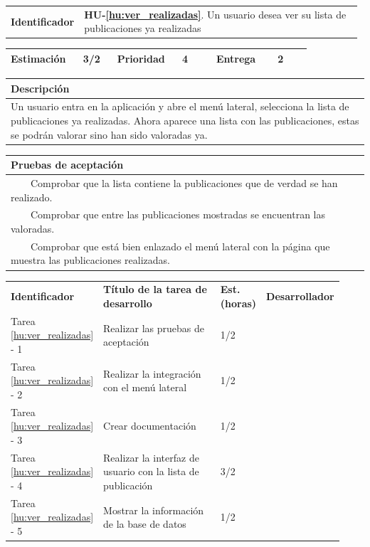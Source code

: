 \documentclass[11pt]{article}
\newcommand{\tabitem}{~~\llap{\textbullet}~~}
\begin{document}
\begin{longtable}{p{0.18\linewidth}|p{0.8\linewidth}}
	\rowcolor{LightCyan}
	\textbf{Identificador} & \textbf{HU-\ref{hu:ver_realizadas}}. Un usuario desea ver su lista de publicaciones ya realizadas \\  
\end{longtable}
\vspace{-0.8cm}
\begin{longtable}{p{0.18\linewidth}|p{0.1\linewidth}|p{0.18\linewidth}|p{0.1\linewidth}|p{0.18\linewidth}|p{0.1\linewidth}}
	\toprule
	\textbf{Estimación} & 3/2 & \textbf{Prioridad} & 4 & \textbf{Entrega} & 2 \\
	\bottomrule
\end{longtable}
\vspace{-0.8cm}
\begin{longtable}{p{1.028\linewidth}}
	\textbf{Descripción}\\
	\midrule
	Un usuario entra en la aplicación y abre el menú lateral, selecciona la lista de publicaciones ya realizadas. Ahora aparece una lista con las publicaciones, estas se podrán valorar sino han sido valoradas ya. \\
	\bottomrule
\end{longtable}
\vspace{-0.8cm}
\begin{longtable}{p{1.028\linewidth}}
	\textbf{Pruebas de aceptación}\\
	\midrule
	\tabitem Comprobar que la lista contiene la publicaciones que de verdad se han realizado.\\
	\tabitem Comprobar que entre las publicaciones mostradas se encuentran las valoradas.\\
	\tabitem Comprobar que está bien enlazado el menú lateral con la página que muestra las publicaciones realizadas.\\
\end{longtable}
\vspace{-0.8cm}
\begin{longtable}{p{0.18\linewidth}|p{0.48\linewidth}|p{0.1\linewidth}|p{0.17\linewidth}}
	\toprule
	\textbf{Identificador} & \textbf{Título de la tarea de desarrollo} & \textbf{Est. (horas)} & \textbf{Desarrollador} \\
	Tarea \ref{hu:ver_realizadas} - 1 & Realizar las pruebas de aceptación & 1/2 &\\
	Tarea \ref{hu:ver_realizadas} - 2 & Realizar la integración con el menú lateral & 1/2 & \\
	Tarea \ref{hu:ver_realizadas} - 3 & Crear documentación & 1/2 & \\
	Tarea \ref{hu:ver_realizadas} - 4 & Realizar la interfaz de usuario con la lista de publicación & 3/2 &  \\
	Tarea \ref{hu:ver_realizadas} - 5 & Mostrar la información de la base de datos & 1/2 &  \\
	\bottomrule
\end{longtable}
\end{document}
